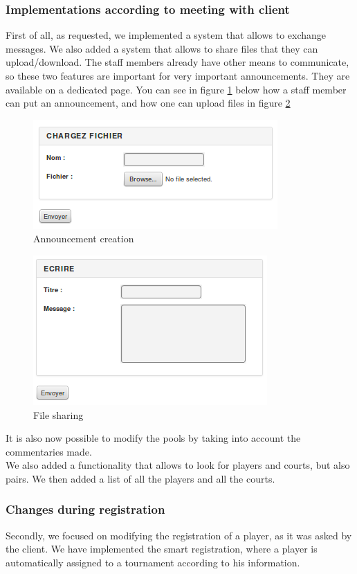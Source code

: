 \documentclass[a4paper, 12pt]{article}
\begin{document}
\subsubsection*{Implementations according to meeting with client}

First of all, as requested, we implemented a system that allows to exchange messages. We also added a system that allows to share files that they can upload/download. The staff members already have other means to communicate, so these two features are important for very important announcements. They are available on a dedicated page. You can see in figure \ref{annonce} below how a staff member can put an announcement, and how one can upload files in figure \ref{file} \\
\begin{figure}[h]
  \caption{\label{annonce} Announcement creation}
  \includegraphics[scale=0.7]{annonce.png}
\end{figure}
\begin{figure}[h]
  \caption{\label{file} File sharing}
  \includegraphics[scale=0.7]{fichier.png}
\end{figure}


It is also now possible to modify the pools by taking into account the commentaries made.\\

We also added a functionality that allows to look for players and courts, but also pairs. We then added a list of all the players and all the courts.

\subsubsection*{Changes during registration}
Secondly, we focused on modifying the registration of a player, as it was asked by the client. We have implemented the smart registration, where a player is automatically assigned to a tournament according to his information.\\
\end{document}
